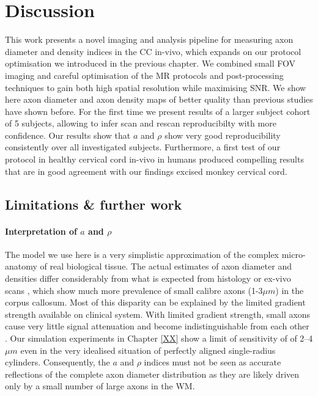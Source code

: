 \section{Discussion}
This work presents a novel imaging and analysis pipeline for measuring axon diameter and density indices in the CC in-vivo, which expands on our \SFasym{} protocol optimisation we introduced in the previous chapter. We combined small FOV imaging and careful optimisation of the MR protocols and post-processing techniques to gain both high spatial resolution while maximising SNR. We show here axon diameter and axon density maps of better quality than previous studies have shown before. For the first time we present results of a larger subject cohort of 5 subjects, allowing to infer scan and rescan reproducibilty with more confidence. Our results show that $a$ and $\rho$ show very good reproducibility consistently over all investigated subjects. Furthermore, a first test of our protocol in healthy cervical cord in-vivo in humans produced compelling results that are in good agreement with our findings excised monkey cervical cord.

\subsection*{Limitations \& further work}
\paragraph{Interpretation of $a$ and $\rho$}The model we use here is a very simplistic approximation of the complex micro-anatomy of real biological tissue. The actual estimates of axon diameter and densities differ considerably from what is expected from histology or ex-vivo scans \citep{Alexander:2010}, which show much more prevalence of small calibre axons (1-3$\mu m$) in the corpus callosum. Most of this disparity can be explained by the limited gradient strength available on clinical system.  With limited gradient strength, small axons cause very little signal attenuation and become indistinguishable from each other \citep{Laett:2007,Yeh:2010}. Our simulation experiments in Chapter \ref{XX} show a limit of sensitivity of of 2--4$\mu m$ even in the very idealised situation of perfectly aligned single-radius cylinders. Consequently, the $a$ and $\rho$ indices must not be seen as accurate reflections of the complete axon diameter distribution as they are likely driven only by a small number of large axons in the WM. 


